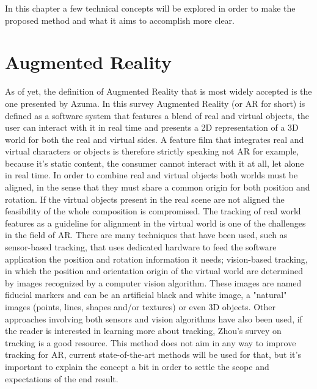 
In this chapter a few technical concepts will be explored in order to make the proposed method and what it aims to accomplish more clear.

\section{Augmented Reality}
As of yet, the definition of Augmented Reality that is most widely accepted is the one presented by Azuma\cite{azuma1997}. In this survey Augmented Reality (or AR for short) is defined as a software system that features a blend of real and virtual objects, the user can interact with it in real time and presents a 2D representation of a 3D world for both the real and virtual sides. A feature film that integrates real and virtual characters or objects is therefore strictly speaking not AR for example, because it's static content, the consumer cannot interact with it at all, let alone in real time.
In order to combine real and virtual objects both worlds must be aligned, in the sense that they must share a common origin for both position and rotation. If the virtual objects present in the real scene are not aligned the feasibility of the whole composition is compromised. The tracking of real world features as a guideline for alignment in the virtual world is one of the challenges in the field of AR. There are many techniques that have been used, such as sensor-based tracking, that uses dedicated hardware to feed the software application the position and rotation information it needs; vision-based tracking, in which the position and orientation origin of the virtual world are determined by images recognized by a computer vision algorithm. These images are named fiducial markers and can be an artificial black and white image, a "natural" images (points, lines, shapes and/or textures) or even 3D objects. Other approaches involving both sensors and vision algorithms have also been used, if the reader is interested in learning more about tracking, Zhou's survey\cite{zhou2008} on tracking is a good resource.
This method does not aim in any way to improve tracking for AR, current state-of-the-art methods will be used for that, but it's important to explain the concept a bit in order to settle the scope and expectations of the end result.

